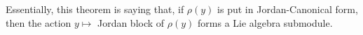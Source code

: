 \documentclass[11pt,leqno,oneside]{amsart}
\numberwithin{thm}{section}
\begin{document}
Essentially, this theorem is saying that, if \(\rho(y)\) is put in
Jordan-Canonical form, then the action \(y \mapsto \) Jordan block of \(\rho(y)\)
forms a Lie algebra submodule.
\end{document}

